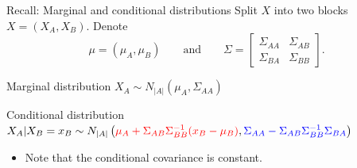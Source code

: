 \documentclass[dvipsnames,aspectratio=169]{beamer} %
\newcommand{\E}{\mathbb{E}}
\begin{document}
\begin{frame}{Recall: Marginal and conditional distributions}
	Split $X$ into two blocks $X=(X_A,X_B)$. Denote $$\mu=(\mu_A,\mu_B)\qquad\mbox{and}\qquad\Sigma=\begin{bmatrix}
		\Sigma_{AA} & \Sigma_{AB}\\
		\Sigma_{BA} & \Sigma_{BB}
	\end{bmatrix}.$$
	\begin{alertblock}{Marginal distribution}
		$X_A\sim N_{|A|}(\mu_A,\Sigma_{AA})$
	\end{alertblock}
	\begin{alertblock}{Conditional distribution}
		$X_A|X_B=x_B\sim N_{|A|}\left(\textcolor{red}{\small \mu_A+\Sigma_{AB}\Sigma_{BB}^{-1}(x_B-\mu_B)},\textcolor{blue}{\small \Sigma_{AA}-\Sigma_{AB}\Sigma_{BB}^{-1}\Sigma_{BA}}\right)$
		\begin{itemize}
			\item Note that the conditional covariance is constant.
		\end{itemize}
	\end{alertblock}
\end{frame}
\end{document}
